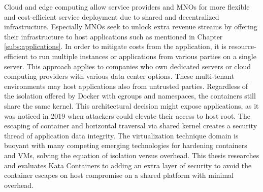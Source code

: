 Cloud and edge computing allow service providers and MNOs for more flexible and cost-efficient service deployment due to shared and decentralized infrastructure. Especially MNOs seek to unlock extra revenue streams by offering their infrastructure to host applications such as mentioned in Chapter \ref{subs:applications}. In order to mitigate costs from the application, it is resource-efficient to run multiple instances or applications from various parties on a single server. This approach applies to companies who own dedicated servers or cloud computing providers with various data center options. These multi-tenant environments may host applications also from untrusted parties. Regardless of the isolation offered by Docker with cgroups and namespaces, the containers still share the same kernel. This architectural decision might expose applications, as it was noticed in 2019 \cite{CVE-2020-14386}\cite{CVE-2019-5736} when attackers could elevate their access to host root. The escaping of container and horizontal traversal via shared kernel creates a security thread of application data integrity. The virtualization technique domain is buoyant with many competing emerging technologies for hardening containers and VMs, solving the equation of isolation versus overhead. This thesis researches and evaluates Kata Containers to adding an extra layer of security to avoid the container escapes on host compromise on a shared platform with minimal overhead. \cite{EdgeComputing5G}






